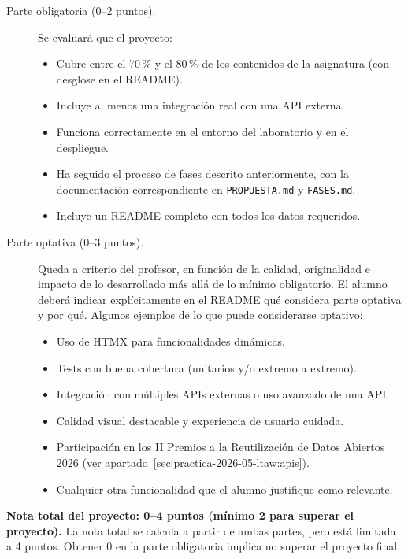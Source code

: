\begin{description}

\item[Parte obligatoria (0--2 puntos).] Se evaluará que el proyecto:
  \begin{itemize}
    \item Cubre entre el 70\,\% y el 80\,\% de los contenidos de la asignatura (con desglose en el README).
    \item Incluye al menos una integración real con una API externa.
    \item Funciona correctamente en el entorno del laboratorio y en el despliegue.
    \item Ha seguido el proceso de fases descrito anteriormente, con la documentación correspondiente en \texttt{PROPUESTA.md} y \texttt{FASES.md}.
    \item Incluye un README completo con todos los datos requeridos.
  \end{itemize}

\item[Parte optativa (0--3 puntos).] Queda a criterio del profesor, en función de la calidad, originalidad e impacto de lo desarrollado más allá de lo mínimo obligatorio. El alumno deberá indicar explícitamente en el README qué considera parte optativa y por qué. Algunos ejemplos de lo que puede considerarse optativo:
  \begin{itemize}
    \item Uso de HTMX para funcionalidades dinámicas.
    \item Tests con buena cobertura (unitarios y/o extremo a extremo).
    \item Integración con múltiples APIs externas o uso avanzado de una API.
    \item Calidad visual destacable y experiencia de usuario cuidada.
    \item Participación en los II Premios a la Reutilización de Datos Abiertos 2026 (ver apartado~\ref{sec:practica-2026-05-ltaw:apis}).
    \item Cualquier otra funcionalidad que el alumno justifique como relevante.
  \end{itemize}

\end{description}

\textbf{Nota total del proyecto: 0--4 puntos (mínimo 2 para superar el proyecto).} La nota total se calcula a partir de ambas partes, pero está limitada a 4 puntos. Obtener 0 en la parte obligatoria implica no superar el proyecto final.

